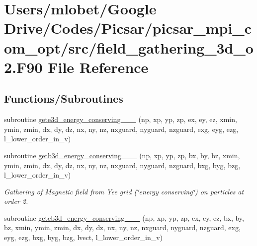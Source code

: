 \hypertarget{field__gathering__3d__o2_8_f90}{}\section{Users/mlobet/\+Google Drive/\+Codes/\+Picsar/picsar\+\_\+mpi\+\_\+com\+\_\+opt/src/field\+\_\+gathering\+\_\+3d\+\_\+o2.F90 File Reference}
\label{field__gathering__3d__o2_8_f90}
\subsection*{Functions/\+Subroutines}
\begin{DoxyCompactItemize}
\item 
subroutine \hyperlink{field__gathering__3d__o2_8_f90_a4bc4ddba4b00ad2b51022fd9ce43c128}{gete3d\+\_\+energy\+\_\+conserving\+\_\+\_\+\_} (np, xp, yp, zp, ex, ey, ez, xmin, ymin, zmin,                                                                                                                                                                           dx, dy, dz, nx, ny, nz, nxguard, nyguard, nzguard,                                                                                                                                                   exg, eyg, ezg, l\+\_\+lower\+\_\+order\+\_\+in\+\_\+v)
\item 
subroutine \hyperlink{field__gathering__3d__o2_8_f90_aaa9c36b2c9467ccd77152e8a92ecfabe}{getb3d\+\_\+energy\+\_\+conserving\+\_\+\_\+\_} (np, xp, yp, zp, bx, by, bz, xmin, ymin, zmin,                                                                                                                                                                           dx, dy, dz, nx, ny, nz, nxguard, nyguard, nzguard,                                                                                                                                                   bxg, byg, bzg, l\+\_\+lower\+\_\+order\+\_\+in\+\_\+v)
\begin{DoxyCompactList}\small\item\em Gathering of Magnetic field from Yee grid (\char`\"{}energy conserving\char`\"{}) on particles at order 2. \end{DoxyCompactList}\item 
subroutine \hyperlink{field__gathering__3d__o2_8_f90_a97bcf4daf98fbda5e03bdd9288025841}{geteb3d\+\_\+energy\+\_\+conserving\+\_\+\_\+\_} (np, xp, yp, zp, ex, ey, ez, bx, by, bz, xmin, ymin, zmin,                                                                                                                                                           dx, dy, dz, nx, ny, nz, nxguard, nyguard, nzguard,                                                                                                                                                   exg, eyg, ezg, bxg, byg, bzg, lvect, l\+\_\+lower\+\_\+order\+\_\+in\+\_\+v)

\end{DoxyCompactItemize}
